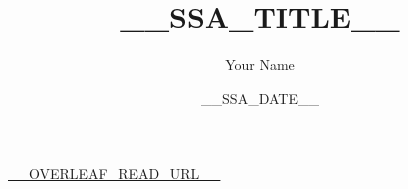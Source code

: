 \documentclass[a4paper]{article}
\title{\textbf{__SSA_TITLE__}}
\author{Your Name}
\date{__SSA_DATE__}
\begin{document}
\maketitle
\begin{center}
    \url{__OVERLEAF_READ_URL__}
\end{center}

\tableofcontents
\clearpage



\clearpage


\clearpage
{}
\printbibliography

\clearpage

\end{document}

